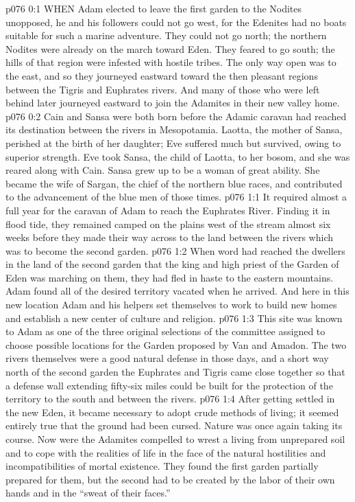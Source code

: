 \vs p076 0:1 WHEN Adam elected to leave the first garden to the Nodites unopposed, he and his followers could not go west, for the Edenites had no boats suitable for such a marine adventure. They could not go north; the northern Nodites were already on the march toward Eden. They feared to go south; the hills of that region were infested with hostile tribes. The only way open was to the east, and so they journeyed eastward toward the then pleasant regions between the Tigris and Euphrates rivers. And many of those who were left behind later journeyed eastward to join the Adamites in their new valley home.
\vs p076 0:2 \pc Cain and Sansa were both born before the Adamic caravan had reached its destination between the rivers in Mesopotamia. Laotta, the mother of Sansa, perished at the birth of her daughter; Eve suffered much but survived, owing to superior strength. Eve took Sansa, the child of Laotta, to her bosom, and she was reared along with Cain. Sansa grew up to be a woman of great ability. She became the wife of Sargan, the chief of the northern blue races, and contributed to the advancement of the blue men of those times.
\vs p076 1:1 It required almost a full year for the caravan of Adam to reach the Euphrates River. Finding it in flood tide, they remained camped on the plains west of the stream almost six weeks before they made their way across to the land between the rivers which was to become the second garden.
\vs p076 1:2 When word had reached the dwellers in the land of the second garden that the king and high priest of the Garden of Eden was marching on them, they had fled in haste to the eastern mountains. Adam found all of the desired territory vacated when he arrived. And here in this new location Adam and his helpers set themselves to work to build new homes and establish a new center of culture and religion.
\vs p076 1:3 This site was known to Adam as one of the three original selections of the committee assigned to choose possible locations for the Garden proposed by Van and Amadon. The two rivers themselves were a good natural defense in those days, and a short way north of the second garden the Euphrates and Tigris came close together so that a defense wall extending fifty\hyp{}six miles could be built for the protection of the territory to the south and between the rivers.
\vs p076 1:4 \pc After getting settled in the new Eden, it became necessary to adopt crude methods of living; it seemed entirely true that the ground had been cursed. Nature was once again taking its course. Now were the Adamites compelled to wrest a living from unprepared soil and to cope with the realities of life in the face of the natural hostilities and incompatibilities of mortal existence. They found the first garden partially prepared for them, but the second had to be created by the labor of their own hands and in the “sweat of their faces.”
